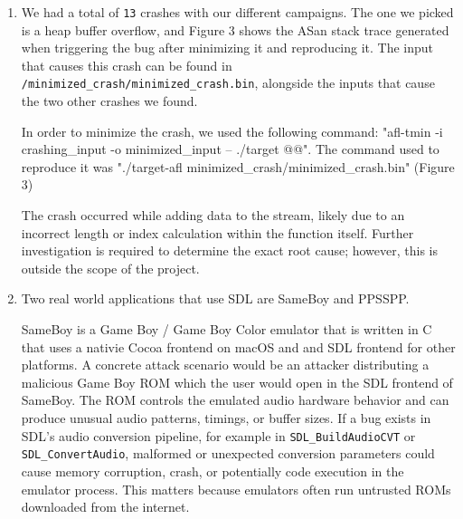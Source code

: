 \documentclass[letterpaper,twocolumn,10pt]{article}
\begin{document}
\begin{enumerate}
    The \texttt{afl-plot} edges graph (Figure 2) shows an exponential discovery curve at the beginning that seems to reach a limit after a few minutes. The curve  rose quickly during the first few minutes, reaching about 880 edges by t = 200s. After that, edge discovery slowed abruptly. Indeed, it only increased with difficulty to 890 at 900s. From this moment on, the edge count stayed flat at this value until the end of the run.

    This suggests the campaign reached coverage saturation for this configuration. The strongest evidence is that no new edges were found for the final 20 min of the run, even though AFL++ completed several more queue cycles, ending at 10 cycles total.

    Yet, the last crash was discovered 8 min after the last edge was found. This gives us the insight that even if coverage is not growing, fuzzing can still find crashes and that finishing a fuzzing campaign earlier just based on coverage is not necessarily a good choice.

    
    \item We had a total of \texttt{13} crashes with our different campaigns. The one we picked is a heap buffer overflow, and Figure 3 shows the ASan stack trace generated when triggering the bug after minimizing it and reproducing it. The input that causes this crash can be found in \texttt{/minimized\_crash/minimized\_crash.bin}, alongside the inputs that cause the two other crashes we found.

    In order to minimize the crash, we used the following command: "afl-tmin -i crashing\_input -o minimized\_input -- ./target @@". The command used to reproduce it was "./target-afl minimized\_crash/minimized\_crash.bin" (Figure 3)

    The crash occurred while adding data to the stream, likely due to an incorrect length or index calculation within the function itself. Further investigation is required to determine the exact root cause; however, this is outside the scope of the project.
    
    \item Two real world applications that use SDL are SameBoy and PPSSPP.
    
    SameBoy is a Game Boy / Game Boy Color emulator that is written in C that uses a nativie Cocoa frontend on macOS and and SDL frontend for other platforms. A concrete attack scenario would be an attacker distributing a malicious Game Boy ROM which the user would open in the SDL frontend of SameBoy. The ROM controls the emulated audio hardware behavior and can produce unusual audio patterns, timings, or buffer sizes. If a bug exists in SDL's audio conversion pipeline, for example in \texttt{SDL\_BuildAudioCVT} or \texttt{SDL\_ConvertAudio}, malformed or unexpected conversion parameters could cause memory corruption,  crash, or potentially code execution in the emulator process. This matters because emulators often run untrusted ROMs downloaded from the internet.


\end{enumerate}
\end{document}
